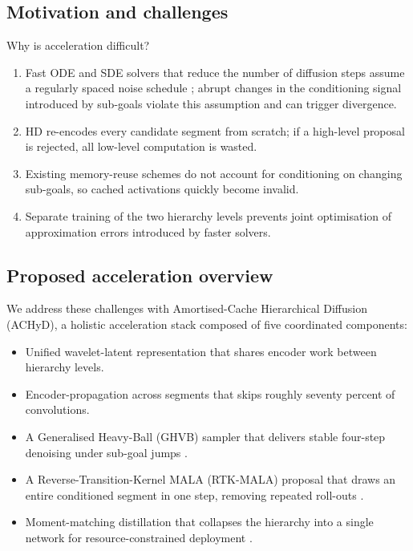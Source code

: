 \documentclass{article}
\begin{document}
\subsection{Motivation and challenges}
Why is acceleration difficult?
\begin{enumerate}
  \item Fast ODE and SDE solvers that reduce the number of diffusion steps assume a regularly spaced noise schedule \cite{li-2023-faster,wizadwongsa-2023-diffusion}; abrupt changes in the conditioning signal introduced by sub-goals violate this assumption and can trigger divergence.
  \item HD re-encodes every candidate segment from scratch; if a high-level proposal is rejected, all low-level computation is wasted.
  \item Existing memory-reuse schemes do not account for conditioning on changing sub-goals, so cached activations quickly become invalid.
  \item Separate training of the two hierarchy levels prevents joint optimisation of approximation errors introduced by faster solvers.
\end{enumerate}

\subsection{Proposed acceleration overview}
We address these challenges with Amortised-Cache Hierarchical Diffusion (ACHyD), a holistic acceleration stack composed of five coordinated components:
\begin{itemize}
  \item Unified wavelet-latent representation that shares encoder work between hierarchy levels.
  \item Encoder-propagation across segments that skips roughly seventy percent of convolutions.
  \item A Generalised Heavy-Ball (GHVB) sampler that delivers stable four-step denoising under sub-goal jumps \cite{wizadwongsa-2023-diffusion}.
  \item A Reverse-Transition-Kernel MALA (RTK-MALA) proposal that draws an entire conditioned segment in one step, removing repeated roll-outs \cite{huang-2024-reverse}.
  \item Moment-matching distillation that collapses the hierarchy into a single network for resource-constrained deployment \cite{salimans-2024-multistep}.
\end{itemize}
\end{document}
